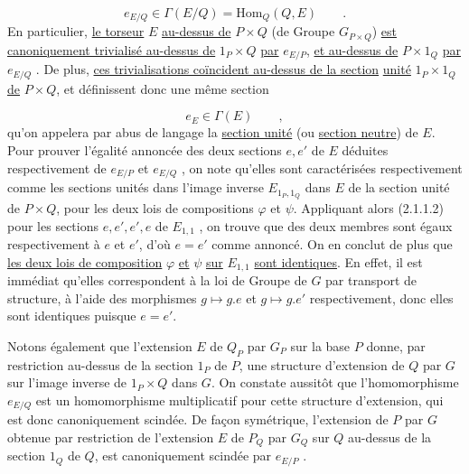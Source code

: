 \begin{equation}\tag{2.2.2}
e_{E/Q} \in \Gamma(E/Q) = \mathrm{Hom}_Q(Q,E) \qquad .
\end{equation}
En particulier, \underline{le torseur} $E$ \underline{au-dessus de} $P\times Q$ (de Groupe $G_{P\times Q}$) \underline{est canoniquement trivialisé au-dessus de} $1_P\times Q$ \underline{par} $e_{E/P}$, \underline{et au-dessus de} $P \times 1_Q$ \underline{par}
$e_{E/Q}$ . De plus, \underline{ces trivialisations coïncident au-dessus de la section}
\underline{unité} $1_P\times 1_Q$ \underline{de} $P\times Q$, et définissent donc une même section 


\begin{equation}\tag{2.2.3}
 e_{E} \in \Gamma(E) \qquad ,
\end{equation}
qu'on appelera par abus de langage la \underline{section unité} (ou \underline{section neutre}) de $E$. Pour prouver l'égalité annoncée des deux sections $e,e'$ de $E$ déduites respectivement de $e_{E/P}$ et $e_{E/Q}$ , on note qu'elles sont caractérisées respectivement comme les sections unités dans l'image inverse $E_{1_{P},1_{Q}}$ dans $E$ de la section unité de $P\times Q$, pour les deux lois de compositions $\varphi$ et $\psi$. Appliquant alors (2.1.1.2) pour les sections $e,e',e',e$ de $E_{1,1}$ , on trouve que des deux membres sont égaux respectivement à $e$ et $e'$, d'où $e=e'$ comme annoncé. On en conclut de plus que \underline{les deux lois de composition} $\varphi$ \underline{et} $\psi$ \underline{sur} $E_{1,1}$ \underline{sont identiques}. En effet, il est immédiat qu'elles correspondent à la loi de Groupe de $G$ par transport de structure, à l'aide des morphismes $g \longmapsto g.e$ et $g \longmapsto g.e'$ respectivement, donc elles sont identiques puisque $e=e'$.

Notons également que l'extension $E$ de $Q_{P}$ par $G_{P}$ sur la base $P$ donne, par restriction au-dessus de la section $1_{P}$ de $P$, une structure d'extension de $Q$ par $G$ sur l'image inverse de $1_{P}\times Q$ dans $G$. On constate aussitôt que l'homomorphisme $e_{E/Q}$ est un homomorphisme multiplicatif pour cette structure d'extension, qui est donc canoniquement scindée. De façon symétrique, l'extension de $P$ par $G$ obtenue par restriction de l'extension $E$ de $P_{Q}$ par $G_{Q}$ sur $Q$ au-dessus de la section $1_{Q}$ de $Q$, est canoniquement scindée par $e_{E/P}$ .



